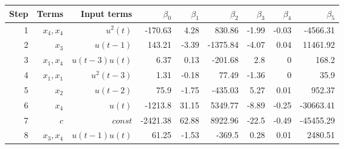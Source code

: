 \begin{tabular}{rrrrrrrrr}
Step & Terms & Input terms & $\beta_{0}$ & $\beta_{1}$ & $\beta_{2}$ & $\beta_{3}$ & $\beta_{4}$ & $\beta_{5}$ \\ 
\hline 
1 & $x_4,x_4$ & $u^2(t)$ & -170.63 & 4.28 & 830.86 & -1.99 & -0.03 & -4566.31 \\ 
2 & $x_3$ & $u(t-1)$& 143.21 & -3.39 & -1375.84 & -4.07 & 0.04 & 11461.92 \\ 
3 & $x_1,x_4$ & $u(t-3)u(t)$ & 6.37 & 0.13 & -201.68 & 2.8 & 0 & 168.2 \\ 
4 & $x_1,x_1$& $u^2(t-3)$ & 1.31 & -0.18 & 77.49 & -1.36 & 0 & 35.9 \\ 
5 & $x_2$ & $u(t-2)$ & 75.9 & -1.75 & -435.03 & 5.27 & 0.01 & 952.37 \\ 
6 & $x_4$ & $u(t)$ & -1213.8 & 31.15 & 5349.77 & -8.89 & -0.25 & -30663.41 \\ 
7 & $c$ & $const$ & -2421.38 & 62.88 & 8922.96 & -22.5 & -0.49 & -45455.29 \\ 
8 & $x_3,x_4$ & $u(t-1)u(t)$ & 61.25 & -1.53 & -369.5 & 0.28 & 0.01 & 2480.51 \\ 
\hline 
\end{tabular}